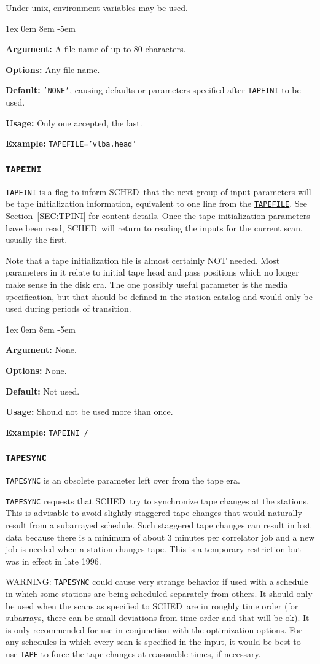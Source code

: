 \documentclass{report}
\newcommand{\schedb}{{\sc SCHED~}}
\newcommand{\rcwbox}[5]{
  \begin{list}{}{\parsep 1ex  \itemsep 0em
                 \leftmargin 8em  \itemindent -5em }
    \item {\bf Argument:} #1
    \item {\bf Options:}  #2
    \item {\bf Default:}  #3
    \item {\bf Usage:}    #4
    \item {\bf Example:}  #5
  \end{list}
}
\begin{document}
Under unix, environment variables may be used.

\rcwbox
{A file name of up to 80 characters.}
{Any file name.}
{{\tt 'NONE'}, causing defaults or parameters specified after
{\tt TAPEINI} to be used.}
{Only one accepted, the last.}
{{\tt TAPEFILE='vlba.head'}}


\subsubsection{\label{MP:TAPEINI}{\tt TAPEINI}}

{\tt TAPEINI} is a flag to inform \schedb that the next group
of input parameters will be tape initialization information,
equivalent to one line from the 
{\hyperref[MP:TAPEFILE]{{\tt TAPEFILE}}}.
See Section~\ref{SEC:TPINI} for content details.  Once the tape
initialization parameters have been read, \schedb will return
to reading the inputs for the current scan, usually the first.

Note that a tape initialization file is almost certainly NOT needed.
Most parameters in it relate to initial tape head and pass positions
which no longer make sense in the disk era.  The one possibly useful
parameter is the media specification, but that should be defined in
the station catalog and would only be used during periods of transition.

\rcwbox
{None.}
{None.}
{Not used.}
{Should not be used more than once.}
{{\tt TAPEINI /}}


\subsubsection{\label{MP:TAPESYNC}{\tt TAPESYNC}}

{\tt TAPESYNC} is an obsolete parameter left over from the tape era.

{\tt TAPESYNC} requests that \schedb try to synchronize tape changes
at the stations.  This is advisable to avoid slightly staggered tape
changes that would naturally result from a subarrayed schedule.
Such staggered tape changes can result in lost data because there
is a minimum of about 3 minutes per correlator job and a new job
is needed when a station changes tape.  This is a temporary
restriction but was in effect in late 1996.

WARNING:  {\tt TAPESYNC} could cause very strange behavior if used
with a schedule in which some stations are being scheduled separately
from others.  It should only be used when the scans as specified to
\schedb are in roughly time order (for subarrays, there can be
small deviations from time order and that will be ok).  It is only
recommended for use in conjunction with the optimization options.
For any schedules in which every scan is specified in the input, it
would be best to use 
{\hyperref[MP:TAPE]{{\tt TAPE}}} to force the
tape changes at reasonable times, if necessary.
\end{document}
